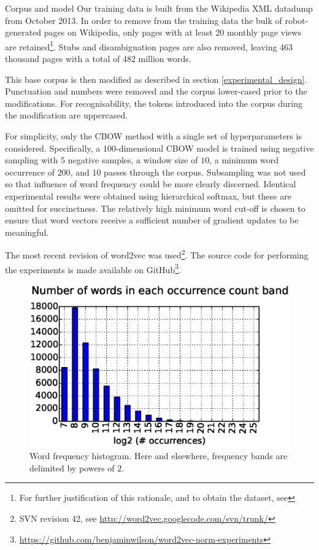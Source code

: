 \documentclass{article} %
\begin{document}
\begin{section}{Corpus and model}
Our training data is built from the Wikipedia XML datadump from October 2013.
In order to remove from the training data the bulk of robot-generated pages on Wikipedia, only pages with at least 20 monthly page views are retained\footnote{For further justification of this rationale, and to obtain the dataset, see \blogpost}.
Stubs and disambiguation pages are also removed, leaving 463 thousand pages with a total of 482 million words.

This base corpus is then modified as described in section \ref{experimental_design}.
Punctuation and numbers were removed and the corpus lower-cased prior to the modifications.
For recognisability, the tokens introduced into the corpus during the modification are uppercased.

For simplicity, only the CBOW method with a single set of hyperparameters is considered.
Specifically, a $100$-dimensional CBOW model is trained using negative sampling with 5 negative samples, a window size of $10$, a minimum word occurrence of $200$, and $10$ passes through the corpus.
Subsampling was not used so that influence of word frequency could be more clearly discerned.
Identical experimental results were obtained using hierarchical softmax, but these are omitted for succinctness.
The relatively high minimum word cut-off is chosen to ensure that word vectors receive a sufficient number of gradient updates to be meaningful.

The most recent revision of word2vec was used\footnote{SVN revision 42, see \url{http://word2vec.googlecode.com/svn/trunk/}}.
The source code for performing the experiments is made available on GitHub\footnote{\url{https://github.com/benjaminwilson/word2vec-norm-experiments}}.

\begin{figure}\label{fig:frequency-histogram}
	\includegraphics[scale=0.5]{occurrence-histogram}
	\caption{
	Word frequency histogram.
	Here and elsewhere, frequency bands are delimited by powers of $2$.
	}
\end{figure}


\end{section}
\end{document}
